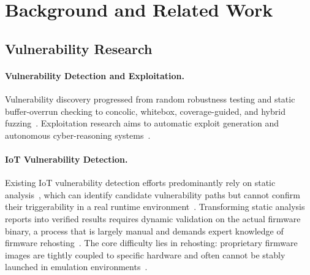 \section{Background and Related Work}
\label{sec:background}




\subsection{Vulnerability Research}

\paragraph{Vulnerability Detection and Exploitation.}
Vulnerability discovery progressed from random robustness testing and static buffer-overrun checking to concolic, whitebox, coverage-guided, and hybrid fuzzing~\cite{fuzz,wagner2000first,godefroid2005dart,godefroid2008automated,bohme2016coverage,stephens2016driller,qsym}.
Exploitation research
aims to automatic exploit generation and autonomous cyber-reasoning systems~\cite{alephone1996stack,shacham2007geometry,brumley2008patchaeg,avgerinos2014automatic,cha2012unleashing,shoshitaishvili2018mechanical}.

\paragraph{IoT Vulnerability Detection.}
Existing IoT vulnerability detection efforts predominantly rely on static analysis~\cite{karonte,satc,emtaint,hermescan,mango,nvwa}, which can identify candidate vulnerability paths but cannot confirm their triggerability in a real runtime environment~\cite{challenges}. Transforming static analysis reports into verified results requires dynamic validation on the actual firmware binary, a process that is largely manual and demands expert knowledge of firmware rehosting~\cite{firmadyne,firmae,greenhouse,pandawan}. The core difficulty lies in rehosting: proprietary firmware images are tightly coupled to specific hardware and often cannot be stably launched in emulation environments~\cite{fuzzware,firmafl}.

